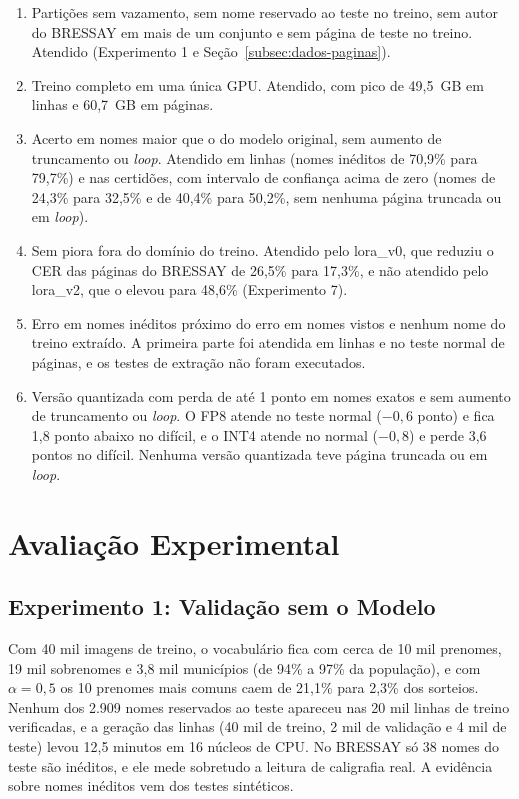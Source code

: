 \begin{enumerate}
    \item Partições sem vazamento, sem nome reservado ao teste no treino, sem autor do BRESSAY em mais de um conjunto e sem página de teste no treino. Atendido (Experimento 1 e Seção~\ref{subsec:dados-paginas}).
    \item Treino completo em uma única GPU. Atendido, com pico de 49,5~GB em linhas e 60,7~GB em páginas.
    \item Acerto em nomes maior que o do modelo original, sem aumento de truncamento ou \emph{loop}. Atendido em linhas (nomes inéditos de 70,9\% para 79,7\%) e nas certidões, com intervalo de confiança acima de zero (nomes de 24,3\% para 32,5\% e de 40,4\% para 50,2\%, sem nenhuma página truncada ou em \emph{loop}).
    \item Sem piora fora do domínio do treino. Atendido pelo lora\_v0, que reduziu o CER das páginas do BRESSAY de 26,5\% para 17,3\%, e não atendido pelo lora\_v2, que o elevou para 48,6\% (Experimento 7).
    \item Erro em nomes inéditos próximo do erro em nomes vistos e nenhum nome do treino extraído. A primeira parte foi atendida em linhas e no teste normal de páginas, e os testes de extração não foram executados.
    \item Versão quantizada com perda de até 1 ponto em nomes exatos e sem aumento de truncamento ou \emph{loop}. O FP8 atende no teste normal ($-0{,}6$ ponto) e fica 1,8 ponto abaixo no difícil, e o INT4 atende no normal ($-0{,}8$) e perde 3,6 pontos no difícil. Nenhuma versão quantizada teve página truncada ou em \emph{loop}.
\end{enumerate}

\section{Avaliação Experimental}
\label{sec:avaliacao}

\subsection{Experimento 1: Validação sem o Modelo}
\label{subsec:exp1}

Com 40 mil imagens de treino, o vocabulário fica com cerca de 10 mil prenomes, 19 mil sobrenomes e 3,8 mil municípios (de 94\% a 97\% da população), e com $\alpha = 0{,}5$ os 10 prenomes mais comuns caem de 21,1\% para 2,3\% dos sorteios. Nenhum dos 2.909 nomes reservados ao teste apareceu nas 20 mil linhas de treino verificadas, e a geração das linhas (40 mil de treino, 2 mil de validação e 4 mil de teste) levou 12,5 minutos em 16 núcleos de CPU. No BRESSAY só 38 nomes do teste são inéditos, e ele mede sobretudo a leitura de caligrafia real. A evidência sobre nomes inéditos vem dos testes sintéticos.

